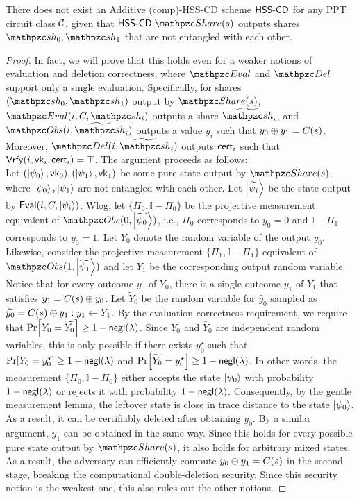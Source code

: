 \begin{theorem}
There does not exist an Additive (comp)-HSS-CD scheme $\mathsf{HSS\textrm{-}CD}$ for
any PPT circuit class $\mathcal{C}$, 
given that $\HSScd.\Sh(s)$ outputs shares $\qsh_0, \qsh_1$ that are
not entangled with each other.
\end{theorem}
\begin{proof}
In fact, we will prove that this holds even for a weaker notions of
evaluation and deletion correctness, where $\Ev$ and $\Del$ support
only a single evaluation. Specifically, for shares $(\qsh_0,
\qsh_1)$ output by $\Sh(s)$, $\Ev(i, C, \qsh_i)$ outputs a share
$\nqsh_i$, and $\Obs(i, \nqsh_i)$ outputs a value $y_i$ such that
$y_0 \oplus y_1 = C(s)$. Moreover, $\Del(i, \nqsh_i)$ outputs
$\mathsf{cert}_i$ such that $\mathsf{Vrfy}(i, \mathsf{vk}_i, \mathsf{cert}_i) = \top$. The argument
proceeds as follows:\\

Let $(\ket{\psi_0}, \mathsf{vk}_0), (\ket{\psi_1}, \mathsf{vk}_1)$ be some pure
state output by $\Sh(s)$, where $\ket{\psi_0}, \ket{\psi_1}$ are not
entangled with each other. Let $\ket{\widetilde{\psi_i}}$ be the
state output by $\mathsf{Eval}(i, C, \ket{\psi_i})$.
Wlog, let $\{\Pi_0, \mathbb{I} - \Pi_0\}$
be the projective measurement equivalent of $\Obs(0,
\ket{\widetilde{\psi_0}})$, i.e., $\Pi_0$ corresponds to $y_0 = 0$
and $\mathbb{I} - \Pi_1$ corresponds to $y_0 = 1$. Let $Y_0$ denote
the random variable of the output $y_0$. Likewise, consider the
projective measurement $\{\Pi_1, \mathbb{I} - \Pi_1\}$ equivalent of
$\Obs(1, \ket{\widetilde{\psi_1}})$ and let $Y_1$ be the
corresponding output
random variable. Notice that for every outcome $y_0$ of $Y_0$, there
is a single outcome $y_1$ of $Y_1$ that satisfies $y_1 = C(s) \oplus
y_0$. Let $\widetilde{Y}_0$ be the random variable for
$\widetilde{y_0}$ sampled as $\widetilde{y_0} = C(s) \oplus y_1 : y_1
\leftarrow Y_1$. By the evaluation correctness requirement, we
require that $\Pr[Y_0 = \widetilde{Y_0}] \ge 1 - {\mathsf{negl}}(\lambda)$.
Since $Y_0$ and $\widetilde{Y_0}$ are independent random variables,
this is only possible if there exists $y_0^\star$ such that $\Pr[Y_0
= y_0^\star] \geq 1 - {\mathsf{negl}}(\lambda)$ and $\Pr[\widetilde{Y_0} =
y_0^\star] \geq 1 - {\mathsf{negl}}(\lambda)$. In other words, the measurement
$\{\Pi_0, \mathbb{I} - \Pi_0\}$ either accepts the state
$\ket{\psi_0}$ with probability $1 - {\mathsf{negl}}(\lambda)$ or rejects it
with probability $1 - {\mathsf{negl}}(\lambda)$. Consequently, by the gentle
measurement lemma, the leftover state is close in trace distance to
the state $\ket{\psi_0}$. As a result, it can be certifiably deleted
after obtaining $y_0$. By a similar argument, $y_1$ can be obtained
in the same way. Since this holds for every possible pure state
output by $\Sh(s)$, it also holds for arbitrary mixed states. As a
result, the adversary can efficiently compute $y_0 \oplus y_1 = C(s)$
in the second-stage, breaking the computational double-deletion
security. Since this security notion is the weakest one, this also
rules out the other notions.  \end{proof}

